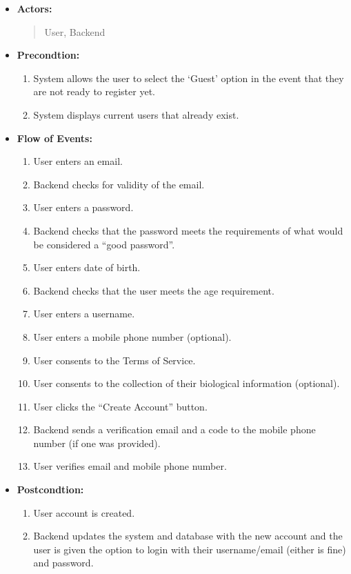\documentclass[a4paper]{article}
\begin{document}
	\begin{itemize}
		\item[] \textbf{Actors:}
		\begin{quote}
			User, Backend
		\end{quote}
		\item[] \textbf{Precondtion:}
		\begin{enumerate}[itemindent=1em]
			\item System allows the user to select the `Guest' option in the event that they are not ready to register yet.
			\item System displays current users that already exist.				
		\end{enumerate}
		\item[] \textbf{Flow of Events:}
		\begin{enumerate}[itemindent=1em]
			\item User enters an email.
			\item Backend checks for validity of the email.
			\item User enters a password.
			\item Backend checks that the password meets the requirements of what would be considered a “good password”.
			\item User enters date of birth.
			\item Backend checks that the user meets the age requirement.
			\item User enters a username.
			\item User enters a mobile phone number (optional).
			\item User consents to the Terms of Service.
			\item User consents to the collection of their biological information (optional).
			\item User clicks the “Create Account” button.
			\item Backend sends a verification email and a code to the mobile phone number (if one was provided).
			\item User verifies email and mobile phone number.					
		\end{enumerate}
		\item[] \textbf{Postcondtion:}
		\begin{enumerate}[itemindent=1em]
			\item User account is created.
			\item Backend updates the system and database with the new account and the user is given the option to login with their username/email (either is fine) and password.			

\end{enumerate}
\end{itemize}
\end{document}
